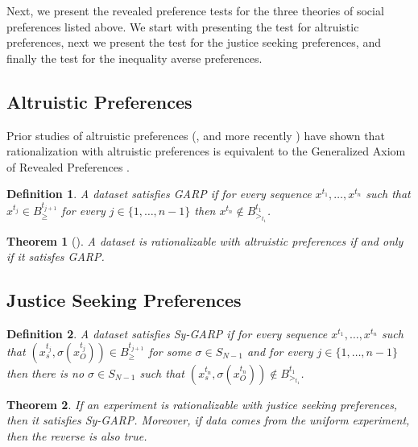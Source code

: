\documentclass[12pt,dvipsnames]{amsart}
\newtheorem{thm}{Theorem}
\newtheorem{defn}{Definition}
\begin{document}
Next, we present the revealed preference tests for the three theories of social preferences listed above. We start with presenting the test for altruistic preferences, next we present the test for the justice seeking preferences, and finally the test for the inequality averse preferences.


\subsection{Altruistic Preferences}

Prior studies of altruistic preferences (\cite{afriat1967construction}, and more recently \cite{nishimura2017unified}) have shown that rationalization with altruistic preferences is equivalent to the Generalized Axiom of Revealed Preferences \citep[introduced by][]{varian1982nonparametric}.



\begin{defn}
\label{def:GARP}
A dataset satisfies GARP if for every sequence $x^{t_1},\ldots,x^{t_n}$ such that $x^{t_j} \in B^{t_{j+1}}_{\geq}$ for every $j\in \{1,\ldots,n-1\}$ then $x^{t_n} \notin B^{t_1}_{>_{t_1}}$.
\end{defn}

\begin{thm}[\cite{afriat1967construction,varian1982nonparametric}]
\label{thm:AP}
A dataset is rationalizable with altruistic preferences if and only if it satisfes GARP.
\end{thm}






\subsection{Justice Seeking Preferences}
\begin{defn}
\label{def:SyGARP}
A dataset satisfies Sy-GARP if for every sequence $x^{t_1},\ldots,x^{t_n}$ such that $(x^{t_j}_s,\sigma(x_O^{t_j})) \in B^{t_{j+1}}_{\geq}$ for some $\sigma\in S_{N-1}$ and for every $j\in \{1,\ldots,n-1\}$ then there is no $\sigma\in S_{N-1}$ such that $(x^{t_n}_s, \sigma(x^{t_n}_O)) \notin B^{t_1}_{>_{t_1}}$.
\end{defn}

\begin{thm}
\label{thm:JS}
If an experiment is rationalizable with justice seeking preferences, then it satisfies Sy-GARP.
Moreover, if data comes from the uniform experiment, then the reverse is also true.
\end{thm}
\end{document}
